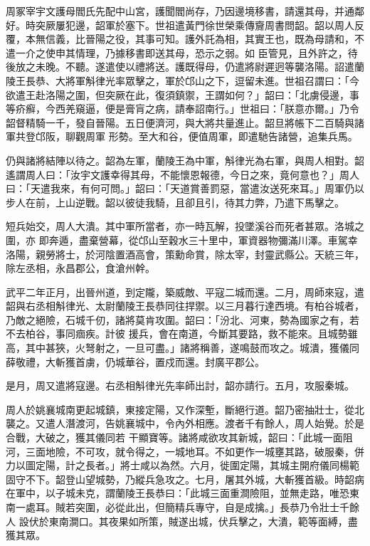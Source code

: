 \begin{pinyinscope}
 周冢宰宇文護母閻氏先配中山宮，護聞閻尚存，乃因邊境移書，請還其母，并通鄰好。時突厥屢犯邊，韶軍於塞下。世祖遣黃門徐世榮乘傳齎周書問韶。韶以周人反覆，本無信義，比晉陽之役，其事可知。護外託為相，其實王也，既為母請和，不遣一介之使申其情理，乃據移書即送其母，恐示之弱。如
 臣管見，且外許之，待後放之未晚。不聽。遂遣使以禮將送。護既得母，仍遣將尉遲迥等襲洛陽。詔遣蘭陵王長恭、大將軍斛律光率眾擊之，軍於邙山之下，逗留未進。世祖召謂曰：「今欲遣王赴洛陽之圍，但突厥在此，復須鎮禦，王謂如何？」韶曰：「北虜侵邊，事等疥癬，今西羌窺逼，便是膏肓之病，請奉詔南行。」世祖曰：「朕意亦爾。」乃令韶督精騎一千，發自晉陽。五日便濟河，與大將共量進止。韶旦將帳下二百騎與諸軍共登邙阪，聊觀周軍
 形勢。至大和谷，便值周軍，即遣馳告諸營，追集兵馬。



 仍與諸將結陣以待之。韶為左軍，蘭陵王為中軍，斛律光為右軍，與周人相對。韶遙謂周人曰：「汝宇文護幸得其母，不能懷恩報德，今日之來，竟何意也？」周人曰：「天遣我來，有何可問。」韶曰：「天道賞善罰惡，當遣汝送死來耳。」周軍仍以步人在前，上山逆戰。韶以彼徒我騎，且卻且引，待其力弊，乃遣下馬擊之。



 短兵始交，周人大潰。其中軍所當者，亦一時瓦解，投墜溪谷而死者甚眾。洛城之圍，亦
 即奔遁，盡棄營幕，從邙山至穀水三十里中，軍資器物彌滿川澤。車駕幸洛陽，親勞將士，於河陰置酒高會，策勳命賞，除太宰，封靈武縣公。天統三年，除左丞相，永昌郡公，食滄州幹。



 武平二年正月，出晉州道，到定隴，築威敵、平寇二城而還。二月，周師來寇，遣韶與右丞相斛律光、太尉蘭陵王長恭同往捍禦。以三月暮行達西境。有柏谷城者，乃敵之絕險，石城千仞，諸將莫肯攻圍。韶曰：「汾北、河東，勢為國家之有，若不去柏谷，事同痼疾。計彼
 援兵，會在南道，今斷其要路，救不能來。且城勢雖高，其中甚狹，火弩射之，一旦可盡。」諸將稱善，遂鳴鼓而攻之。城潰，獲儀同薛敬禮，大斬獲首虜，仍城華谷，置戍而還。封廣平郡公。



 是月，周又遣將寇邊。右丞相斛律光先率師出討，韶亦請行。五月，攻服秦城。



 周人於姚襄城南更起城鎮，東接定陽，又作深塹，斷絕行道。韶乃密抽壯士，從北襲之。又遣人潛渡河，告姚襄城中，令內外相應。渡者千有餘人，周人始覺。於是合戰，大破之，獲其儀同若
 干顯寶等。諸將咸欲攻其新城，韶曰：「此城一面阻河，三面地險，不可攻，就令得之，一城地耳。不如更作一城壅其路，破服秦，併力以圖定陽，計之長者。」將士咸以為然。六月，徙圍定陽，其城主開府儀同楊範固守不下。韶登山望城勢，乃縱兵急攻之。七月，屠其外城，大斬獲首級。時韶病在軍中，以子城未克，謂蘭陵王長恭曰：「此城三面重澗險阻，並無走路，唯恐東南一處耳。賊若突圍，必從此出，但簡精兵專守，自是成擒。」長恭乃令壯士千餘人
 設伏於東南澗口。其夜果如所策，賊遂出城，伏兵擊之，大潰，範等面縛，盡獲其眾。




\end{pinyinscope}
